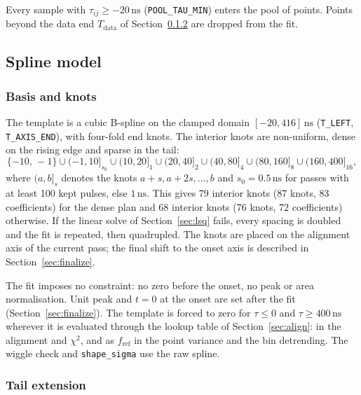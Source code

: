 \documentclass[11pt]{article}
\newcommand{\ns}{\,\mathrm{ns}}
\newcommand{\code}[1]{\texttt{#1}}
\begin{document}
Every sample with $\tau_{ij} \ge -20\ns$ (\code{POOL\_TAU\_MIN}) enters the pool of points. Points beyond the data end $T_{\mathrm{data}}$ of Section~\ref{sec:tail} are dropped from the fit.

\subsection{Spline model}
\label{sec:model}

\subsubsection{Basis and knots}

The template is a cubic B-spline on the clamped domain $[-20, 416]\ns$ (\code{T\_LEFT}, \code{T\_AXIS\_END}), with four-fold end knots. The interior knots are non-uniform, dense on the rising edge and sparse in the tail:
\begin{equation}
\{-10,\,-1\} \cup (-1, 10]_{s_0} \cup (10, 20]_{1} \cup (20, 40]_{2} \cup (40, 80]_{4} \cup (80, 160]_{8} \cup (160, 400]_{16},
\end{equation}
where $(a, b]_s$ denotes the knots $a + s, a + 2s, \dots, b$ and $s_0 = 0.5\ns$ for passes with at least 100 kept pulses, else $1\ns$. This gives 79 interior knots (87 knots, 83 coefficients) for the dense plan and 68 interior knots (76 knots, 72 coefficients) otherwise. If the linear solve of Section~\ref{sec:lsq} fails, every spacing is doubled and the fit is repeated, then quadrupled. The knots are placed on the alignment axis of the current pass; the final shift to the onset axis is described in Section~\ref{sec:finalize}.

The fit imposes no constraint: no zero before the onset, no peak or area normalisation. Unit peak and $t = 0$ at the onset are set after the fit (Section~\ref{sec:finalize}). The template is forced to zero for $\tau \le 0$ and $\tau \ge 400\ns$ wherever it is evaluated through the lookup table of Section~\ref{sec:align}: in the alignment and $\chi^2$, and as $f_{\mathrm{ref}}$ in the point variance and the bin detrending. The wiggle check and \code{shape\_sigma} use the raw spline.

\subsubsection{Tail extension}
\label{sec:tail}
\end{document}
